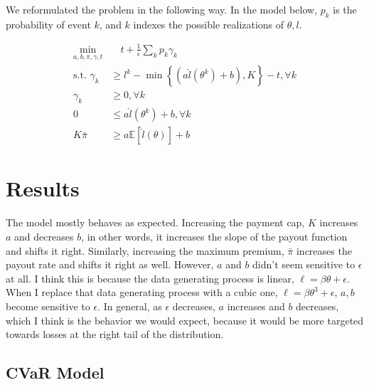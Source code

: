 \documentclass[11pt]{article}
\begin{document}
    We reformulated the problem in the following way. In the model below, $p_k$ is the probability of event $k$, and $k$ indexes the possible realizations of $\theta, l$.

    \begin{align}
        \min_{a,b,\pi,\gamma,t} &\quad t + \frac{1}{\epsilon}\sum_k p_k \gamma_k\\
        \text{s.t.   } \gamma_k &\geq l^k - \min\left\{(a\hat{l}(\theta^k) + b), K\right\} - t, \forall k\\
        \gamma_k &\geq 0, \forall k \\
        0 &\leq a\hat{l}(\theta^k) + b, \forall k\\
        K\bar{\pi} &\geq a\mathbb{E}[\hat{l}(\theta)] + b
    \end{align}

\section{Results}
The model mostly behaves as expected. Increasing the payment cap, $K$ increases $a$ and decreases $b$, in other words, it increases the slope of the payout function and shifts it right. Similarly, increasing the maximum premium, $\bar{\pi}$ increases the payout rate and shifts it right as well. However, $a$ and $b$ didn't seem sensitive to $\epsilon$ at all. I think this is because the data generating process is linear, $\ell = \beta \theta + \epsilon$. When I replace that data generating process with a cubic one, $\ell = \beta \theta^3 + \epsilon$, $a,b$ become sensitive to $\epsilon$. In general, as $\epsilon$ decreases, $a$ increases and $b$ decreases, which I think is the behavior we would expect, because it would be more targeted towards losses at the right tail of the distribution. 
    \subsection*{CVaR Model}
\end{document}
